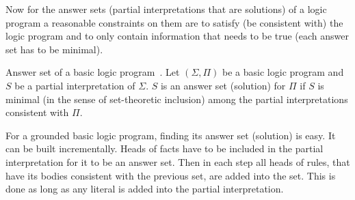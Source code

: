 Now for the answer sets (partial interpretations that are solutions)
of a logic program a reasonable constraints
on them are to satisfy (be consistent with) the logic program and to only contain
information that needs to be true (each answer set has to be minimal).

%
%
\begin{definition}{Answer set of a basic logic program~\cite{KRHandbook}.}\label{def:as_basic}
    Let $(\Sigma, \Pi)$ be a basic logic program and $S$ be a partial interpretation
    of $\Sigma$. $S$ is an answer set (solution) for $\Pi$ if $S$ is minimal
    (in the sense of set-theoretic inclusion) among the partial interpretations
    consistent with $\Pi$.
\end{definition}

For a grounded basic logic program, finding its answer set (solution)
is easy. It can be built incrementally.
Heads of facts have to be included in the partial interpretation for it to be
an answer set. Then in each step all heads of rules, that have its
bodies consistent with the previous set, are added into the set.
This is done as long as any literal is added into the partial interpretation.

